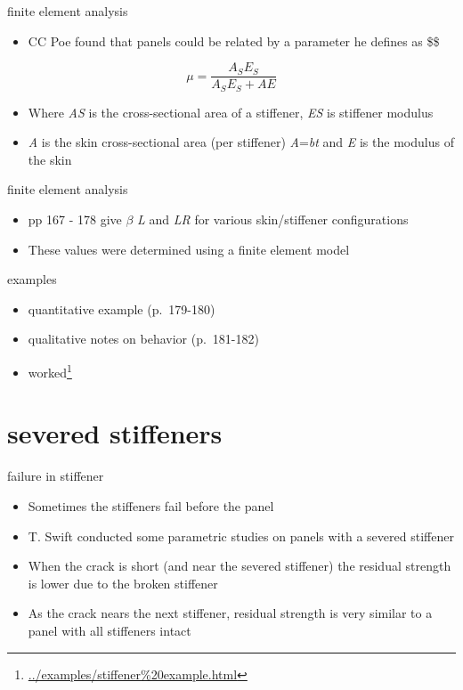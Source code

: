 \documentclass[
  letterpaper,
  ignorenonframetext,
  aspectratio=43,
  handout,
  12pt]{beamer}
\DeclareRobustCommand{\href}[2]{#2\footnote{\url{#1}}}
\providecommand{\tightlist}{%
  \setlength{\itemsep}{0pt}\setlength{\parskip}{0pt}}
\providecommand{\tightlist}{%
\setlength{\itemsep}{0pt}\setlength{\parskip}{0pt}}
\begin{document}
\begin{frame}{finite element analysis}
\protect\hypertarget{finite-element-analysis}{}
\begin{itemize}
\tightlist
\item
  CC Poe found that panels could be related by a parameter he defines as
  \$\mu\$
\end{itemize}

\[\mu = \frac{A_S E_S}{A_S E_S + A E}\]

\begin{itemize}
\tightlist
\item
  Where \emph{A}\emph{S} is the cross-sectional area of a stiffener,
  \emph{E}\emph{S} is stiffener modulus
\item
  \emph{A} is the skin cross-sectional area (per stiffener)
  \emph{A}=\emph{bt} and \emph{E} is the modulus of the skin
\end{itemize}
\end{frame}

\begin{frame}{finite element analysis}
\protect\hypertarget{finite-element-analysis-1}{}
\begin{itemize}
\tightlist
\item
  pp 167 - 178 give \(\beta\) \emph{L} and \emph{L}\emph{R} for various
  skin/stiffener configurations
\item
  These values were determined using a finite element model
\end{itemize}
\end{frame}

\begin{frame}{examples}
\protect\hypertarget{examples}{}
\begin{itemize}
\tightlist
\item
  quantitative example (p.~179-180)
\item
  qualitative notes on behavior (p.~181-182)
\item
  \href{../examples/stiffener\%20example.html}{worked}
\end{itemize}
\end{frame}

\hypertarget{severed-stiffeners}{%
\section{severed stiffeners}\label{severed-stiffeners}}

\begin{frame}{failure in stiffener}
\protect\hypertarget{failure-in-stiffener}{}
\begin{itemize}
\tightlist
\item
  Sometimes the stiffeners fail before the panel
\item
  T. Swift conducted some parametric studies on panels with a severed
  stiffener
\item
  When the crack is short (and near the severed stiffener) the residual
  strength is lower due to the broken stiffener
\item
  As the crack nears the next stiffener, residual strength is very
  similar to a panel with all stiffeners intact
\end{itemize}
\end{frame}
\end{document}

